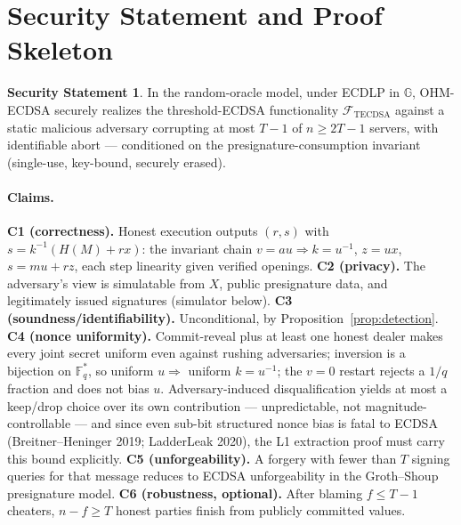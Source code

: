 \documentclass[11pt]{article}
\theoremstyle{plain}
\theoremstyle{definition}
\newtheorem{conjecture}{Security Statement}
\theoremstyle{remark}
\newcommand{\Fq}{\mathbb{F}_q}
\newcommand{\GG}{\mathbb{G}}
\begin{document}
\section{Security Statement and Proof Skeleton}\label{sec:security}

\begin{conjecture}\label{conj:main}
In the random-oracle model, under ECDLP in $\GG$, OHM-ECDSA securely realizes the threshold-ECDSA functionality $\mathcal{F}_{\mathrm{TECDSA}}$ against a static malicious adversary corrupting at most $T{-}1$ of $n \geq 2T{-}1$ servers, with identifiable abort --- conditioned on the presignature-consumption invariant (single-use, key-bound, securely erased).
\end{conjecture}

\paragraph{Claims.}
\textbf{C1 (correctness).} Honest execution outputs $(r,s)$ with $s = k^{-1}(H(M) + rx)$: the invariant chain $v = a u \Rightarrow k = u^{-1}$, $z = u x$, $s = m u + r z$, each step linearity given verified openings.
\textbf{C2 (privacy).} The adversary's view is simulatable from $X$, public presignature data, and legitimately issued signatures (simulator below).
\textbf{C3 (soundness/identifiability).} Unconditional, by Proposition~\ref{prop:detection}.
\textbf{C4 (nonce uniformity).} Commit-reveal plus at least one honest dealer makes every joint secret uniform even against rushing adversaries; inversion is a bijection on $\Fq^*$, so uniform $u \Rightarrow$ uniform $k = u^{-1}$; the $v = 0$ restart rejects a $1/q$ fraction and does not bias $u$. Adversary-induced disqualification yields at most a keep/drop choice over its own contribution --- unpredictable, not magnitude-controllable --- and since even sub-bit structured nonce bias is fatal to ECDSA (Breitner--Heninger 2019; LadderLeak 2020), the L1 extraction proof must carry this bound explicitly.
\textbf{C5 (unforgeability).} A forgery with fewer than $T$ signing queries for that message reduces to ECDSA unforgeability in the Groth--Shoup presignature model.
\textbf{C6 (robustness, optional).} After blaming $f \leq T{-}1$ cheaters, $n - f \geq T$ honest parties finish from publicly committed values.
\end{document}
